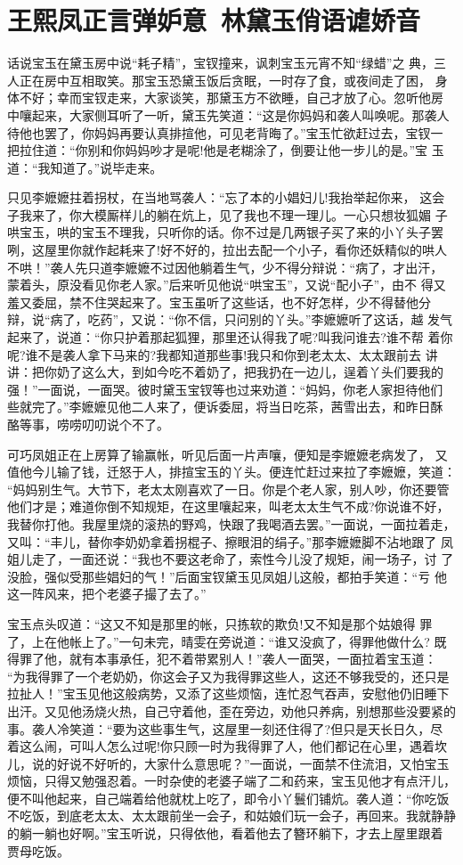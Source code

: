 \chapter{王熙凤正言弹妒意~林黛玉俏语谑娇音}

话说宝玉在黛玉房中说“耗子精”，宝钗撞来，讽刺宝玉元宵不知“绿蜡”之
典，三人正在房中互相取笑。那宝玉恐黛玉饭后贪眠，一时存了食，或夜间走了困，
身体不好；幸而宝钗走来，大家谈笑，那黛玉方不欲睡，自己才放了心。忽听他房
中嚷起来，大家侧耳听了一听，黛玉先笑道：“这是你妈妈和袭人叫唤呢。那袭人
待他也罢了，你妈妈再要认真排揎他，可见老背晦了。”宝玉忙欲赶过去，宝钗一
把拉住道：“你别和你妈妈吵才是呢!他是老糊涂了，倒要让他一步儿的是。”宝
玉道：“我知道了。”说毕走来。

只见李嬷嬷拄着拐杖，在当地骂袭人：“忘了本的小娼妇儿!我抬举起你来，
这会子我来了，你大模厮样儿的躺在炕上，见了我也不理一理儿。一心只想妆狐媚
子哄宝玉，哄的宝玉不理我，只听你的话。你不过是几两银子买了来的小丫头子罢
咧，这屋里你就作起耗来了!好不好的，拉出去配一个小子，看你还妖精似的哄人
不哄！”袭人先只道李嬷嬷不过因他躺着生气，少不得分辩说：“病了，才出汗，
蒙着头，原没看见你老人家。”后来听见他说“哄宝玉”，又说“配小子”，由不
得又羞又委屈，禁不住哭起来了。宝玉虽听了这些话，也不好怎样，少不得替他分
辩，说“病了，吃药”，又说：“你不信，只问别的丫头。”李嬷嬷听了这话，越
发气起来了，说道：“你只护着那起狐狸，那里还认得我了呢?叫我问谁去?谁不帮
着你呢?谁不是袭人拿下马来的?我都知道那些事!我只和你到老太太、太太跟前去
讲讲：把你奶了这么大，到如今吃不着奶了，把我扔在一边儿，逞着丫头们要我的
强！”一面说，一面哭。彼时黛玉宝钗等也过来劝道：“妈妈，你老人家担待他们
些就完了。”李嬷嬷见他二人来了，便诉委屈，将当日吃茶，茜雪出去，和昨日酥
酪等事，唠唠叨叨说个不了。

可巧凤姐正在上房算了输赢帐，听见后面一片声嚷，便知是李嬷嬷老病发了，
又值他今儿输了钱，迁怒于人，排揎宝玉的丫头。便连忙赶过来拉了李嬷嬷，笑道：
“妈妈别生气。大节下，老太太刚喜欢了一日。你是个老人家，别人吵，你还要管
他们才是；难道你倒不知规矩，在这里嚷起来，叫老太太生气不成?你说谁不好，
我替你打他。我屋里烧的滚热的野鸡，快跟了我喝酒去罢。”一面说，一面拉着走，
又叫：“丰儿，替你李奶奶拿着拐棍子、擦眼泪的绢子。”那李嬷嬷脚不沾地跟了
凤姐儿走了，一面还说：“我也不要这老命了，索性今儿没了规矩，闹一场子，讨
了没脸，强似受那些娼妇的气！”后面宝钗黛玉见凤姐儿这般，都拍手笑道：“亏
他这一阵风来，把个老婆子撮了去了。”

宝玉点头叹道：“这又不知是那里的帐，只拣软的欺负!又不知是那个姑娘得
罪了，上在他帐上了。”一句未完，晴雯在旁说道：“谁又没疯了，得罪他做什么?
既得罪了他，就有本事承任，犯不着带累别人！”袭人一面哭，一面拉着宝玉道：
“为我得罪了一个老奶奶，你这会子又为我得罪这些人，这还不够我受的，还只是
拉扯人！”宝玉见他这般病势，又添了这些烦恼，连忙忍气吞声，安慰他仍旧睡下
出汗。又见他汤烧火热，自己守着他，歪在旁边，劝他只养病，别想那些没要紧的
事。袭人冷笑道：“要为这些事生气，这屋里一刻还住得了?但只是天长日久，尽
着这么闹，可叫人怎么过呢!你只顾一时为我得罪了人，他们都记在心里，遇着坎
儿，说的好说不好听的，大家什么意思呢？”一面说，一面禁不住流泪，又怕宝玉
烦恼，只得又勉强忍着。一时杂使的老婆子端了二和药来，宝玉见他才有点汗儿，
便不叫他起来，自己端着给他就枕上吃了，即令小丫鬟们铺炕。袭人道：“你吃饭
不吃饭，到底老太太、太太跟前坐一会子，和姑娘们玩一会子，再回来。我就静静
的躺一躺也好啊。”宝玉听说，只得依他，看着他去了簪环躺下，才去上屋里跟着
贾母吃饭。

